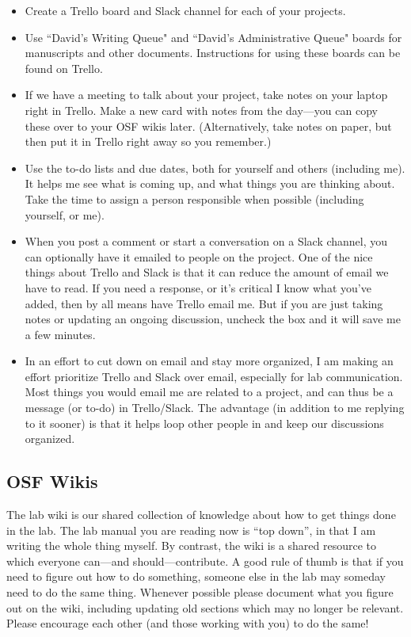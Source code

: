 \documentclass[letterpaper,12pt,oneside]{memoir}
\begin{document}
\begin{itemize}
\item Create a Trello board and Slack channel for each of your projects.

\item Use ``David's Writing Queue" and ``David's Administrative Queue" boards for manuscripts and other documents. Instructions for using these boards can be found on Trello.

\item If we have a meeting to talk about your project, take notes on your laptop right in Trello. Make a new card with notes from the day---you can copy these over to your OSF wikis later. (Alternatively, take notes on paper, but then put it in Trello right away so you remember.)

\item Use the to-do lists and due dates, both for yourself and others (including me). It helps me see what is coming up, and what things you are thinking about. Take the time to assign a person responsible when possible (including yourself, or me).

\item When you post a comment or start a conversation on a Slack channel, you can optionally have it emailed to people on the project. One of the nice things about Trello and Slack is that it can reduce the amount of email we have to read. If you need a response, or it's critical I know what you've added, then by all means have Trello email me. But if you are just taking notes or updating an ongoing discussion, uncheck the box and it will save me a few minutes.

\item In an effort to cut down on email and stay more organized, I am making an effort prioritize Trello and Slack over email, especially for lab communication. Most things you would email me are related to a project, and can thus be a message (or to-do) in Trello/Slack. The advantage (in addition to me replying to it sooner) is that it helps loop other people in and keep our discussions organized. 

\end{itemize}


\subsection{OSF Wikis}

The lab wiki is our shared collection of knowledge about how to get things done in the lab. The lab manual you are reading now is ``top down'', in that I am writing the whole thing myself. By contrast, the wiki is a shared resource to which everyone can---and should---contribute. A good rule of thumb is that if you need to figure out how to do something, someone else in the lab may someday need to do the same thing. Whenever possible please document what you figure out on the wiki, including updating old sections which may no longer be relevant. Please encourage each other (and those working with you) to do the same!
\end{document}
